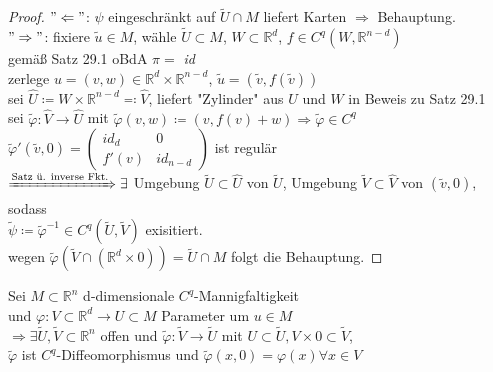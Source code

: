 \begin{proof}
$"\Leftarrow"$: $\psi $ eingeschränkt auf $\tilde{U} \cap M $ liefert Karten 
$\Rightarrow$ Behauptung. \\
$"\Rightarrow"$: fixiere $\tilde{u} \in M $, wähle $\tilde{U} \subset M $,
$W \subset \mathbb{R}^d $, $f \in C^q \left( W, \mathbb{R}^{n-d} \right)$ \\
gemäß Satz 29.1 oBdA $\pi = $ \textit{id} \\
zerlege $u = (v,w) \in \mathbb{R}^d \times \mathbb{R}^{n-d}$, 
$\tilde{u} = \left( \tilde{v}, f \left( \tilde{v} \right) \right) $ \\
sei $\hat{U} \coloneqq W \times \mathbb{R}^{n-d} \eqqcolon \hat{V} $,
liefert "Zylinder" aus $U$ und $W$ in Beweis zu Satz 29.1 \\
sei $\tilde{\varphi}: \hat{V} \rightarrow \hat{U} $ mit
$\tilde{\varphi} (v,w) \coloneqq (v, f(v) + w) \Rightarrow \tilde{\varphi} \in C^q $ \\
$\tilde{\varphi}' \left( \tilde{v}, 0 \right) =
    \begin{pmatrix}
    \textit{id}_d & 0 \\
    f'(v)         & \textit{id}_{n-d}
    \end{pmatrix}
$ ist regulär \\
$\xRightarrow{\text{Satz ü. inverse Fkt.}} \exists $ 
Umgebung $ \tilde{U} \subset \hat{U}$ von $\tilde{U}$,
Umgebung $ \tilde{V} \subset \hat{V} $ von $ \left( \tilde{v}, 0 \right) $, sodass \\
$\tilde{\psi} \coloneqq \tilde{\varphi}^{-1} \in C^q \left( \tilde{U}, \tilde{V} \right) $
exisitiert. \\
wegen $\tilde{\varphi} \left( \tilde{V} \cap \left( \mathbb{R}^d \times {0} \right) \right)
= \tilde{U} \cap M $ folgt die Behauptung.
\end{proof}

\begin{folgerung}
Sei $M \subset \mathbb{R}^n$ d-dimensionale $C^q$-Mannigfaltigkeit \\
und $\varphi: V \subset \mathbb{R}^d \rightarrow U \subset M $ Parameter um $u \in M $ \\
$\Longrightarrow \exists \tilde{U}, \tilde{V} \subset \mathbb{R}^n $ offen und 
$\tilde{\varphi} : \tilde{V} \rightarrow \tilde{U} $ 
mit $ U \subset \tilde{U}, V \times {0} \subset \tilde{V} $, \\
$\tilde{\varphi} $ ist $C^q$-Diffeomorphismus und
$\tilde{\varphi} (x, 0) = \varphi (x) \forall x \in V $
\end{folgerung}

